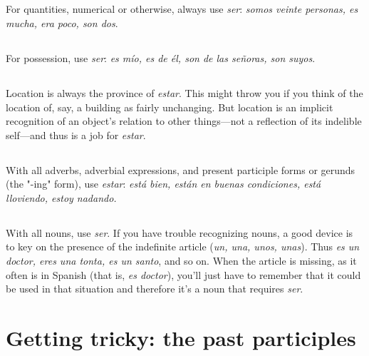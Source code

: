 \documentclass[14pt,a4paper,oneside]{memoir}
\begin{document}
\subsection{}

For quantities, numerical or otherwise, always use \emph{ser}: \emph{somos veinte personas, es mucha, era poco, son dos}.

\subsection{}

For possession, use \emph{ser}: \emph{es mío, es de él, son de las señoras,
	son suyos}.

\subsection{}

Location is always the province of \emph{estar}. This might throw
you if you think of the location of, say, a building as fairly unchanging.
But location is an implicit recognition of an object's relation to other
things---not a reflection of its indelible self---and thus is a job for
\emph{estar}.

\subsection{}

With all adverbs, adverbial expressions, and present participle forms or gerunds (the "-ing" form), use \emph{estar}: \emph{está bien, están en
	buenas condiciones, está lloviendo, estoy nadando.}

\subsection{}

With all nouns, use \emph{ser}. If you have trouble recognizing
nouns, a good device is to key on the presence of the indefinite article
(\emph{un, una, unos, unas}). Thus \emph{es un doctor, eres una tonta, es un santo},
and so on. When the article is missing, as it often is in Spanish (that is,
\emph{es doctor}), you'll just have to remember that it could be used in that
situation and therefore it's a noun that requires \emph{ser}.

\section{Getting tricky: the past participles}
\end{document}
